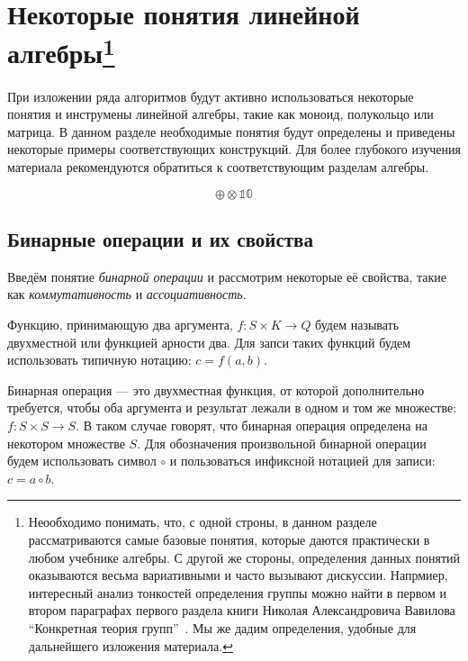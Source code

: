 \chapter[Некоторые понятия линейной алгебры]{Некоторые понятия линейной алгебры\footnote{Неообходимо понимать, что, с одной строны, в данном разделе рассматриваются самые базовые понятия, которые даются практически в любом учебнике алгебры. С другой же стороны, определения данных понятий оказываются весьма вариативными и часто вызывают дискуссии. Напрмиер, интересный анализ тонкостей определения группы можно найти в первом и втором параграфах первого раздела книги Николая Александровича Вавилова ``Конкретная теория групп''~\cite{VavilovGroups}. Мы же дадим определения, удобные для дальнейшего изложения материала.}}\label{chpt:LinAlIntro}

При изложении ряда алгоритмов будут активно использоваться некоторые понятия и инструмены линейной алгебры, такие как моноид, полукольцо или матрица.
В данном разделе необходимые понятия будут определены и приведены некоторые примеры соответствующих конструкций. Для более глубокого изучения материала рекомендуются обратиться к соответствующим разделам алгебры.

$$
\oplus
\otimes
\mathbb{1}
\mathbb{0}
$$

\section{Бинарные операции и их свойства}


Введём понятие \textit{бинарной операции} и рассмотрим некоторые её свойства, такие как \textit{коммутативность} и \textit{ассоциативность}.

\begin{definition} Функцию, принимающую два аргумента, $f: S \times K \to Q$ будем называть двухместной или функцией арности два.
Для запси таких функций будем использовать типичную нотацию: $c = f(a,b)$.
\end{definition}


\begin{definition} 
Бинарная операция --- это двухместная функция, от которой дополнительно требуется, чтобы оба аргумента и результат лежали в одном и том же множестве: $f: S \times S \to S$. В таком случае говорят, что бинарная операция определена на некотором множестве $S$. Для обозначения произвольной бинарной операции будем использовать символ $\circ$ и пользоваться инфиксной нотацией для записи: $c = a \circ b$.
\end{definition}




